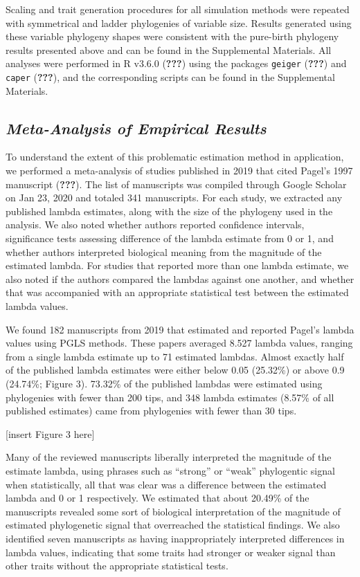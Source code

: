 \documentclass[
]{article}
\begin{document}
Scaling and trait generation procedures for all simulation methods were
repeated with symmetrical and ladder phylogenies of variable size.
Results generated using these variable phylogeny shapes were consistent
with the pure-birth phylogeny results presented above and can be found
in the Supplemental Materials. All analyses were performed in R v3.6.0
({\textbf{???}}) using the packages \texttt{geiger} ({\textbf{???}}) and
\texttt{caper} ({\textbf{???}}), and the corresponding scripts can be
found in the Supplemental Materials.

\hypertarget{meta-analysis-of-empirical-results}{%
\subsection{\texorpdfstring{\emph{Meta-Analysis of Empirical
Results}}{Meta-Analysis of Empirical Results}}\label{meta-analysis-of-empirical-results}}

To understand the extent of this problematic estimation method in
application, we performed a meta-analysis of studies published in 2019
that cited Pagel's 1997 manuscript ({\textbf{???}}). The list of
manuscripts was compiled through Google Scholar on Jan 23, 2020 and
totaled 341 manuscripts. For each study, we extracted any published
lambda estimates, along with the size of the phylogeny used in the
analysis. We also noted whether authors reported confidence intervals,
significance tests assessing difference of the lambda estimate from 0 or
1, and whether authors interpreted biological meaning from the magnitude
of the estimated lambda. For studies that reported more than one lambda
estimate, we also noted if the authors compared the lambdas against one
another, and whether that was accompanied with an appropriate
statistical test between the estimated lambda values. \hfill\break

We found 182 manuscripts from 2019 that estimated and reported Pagel's
lambda values using PGLS methods. These papers averaged 8.527 lambda
values, ranging from a single lambda estimate up to 71 estimated
lambdas. Almost exactly half of the published lambda estimates were
either below 0.05 (25.32\%) or above 0.9 (24.74\%; Figure 3). 73.32\% of
the published lambdas were estimated using phylogenies with fewer than
200 tips, and 348 lambda estimates (8.57\% of all published estimates)
came from phylogenies with fewer than 30 tips. \hfill\break

{[}insert Figure 3 here{]} \hfill\break

Many of the reviewed manuscripts liberally interpreted the magnitude of
the estimate lambda, using phrases such as ``strong'' or ``weak''
phylogentic signal when statistically, all that was clear was a
difference between the estimated lambda and 0 or 1 respectively. We
estimated that about 20.49\% of the manuscripts revealed some sort of
biological interpretation of the magnitude of estimated phylogenetic
signal that overreached the statistical findings. We also identified
seven manuscripts as having inappropriately interpreted differences in
lambda values, indicating that some traits had stronger or weaker signal
than other traits without the appropriate statistical tests.
\hfill\break
\end{document}
